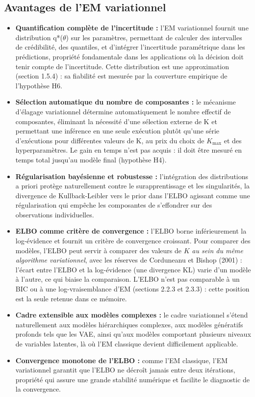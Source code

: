 \subsection{Avantages de l'EM variationnel}
\begin{itemize}
\item \textbf{Quantification complète de l'incertitude : }l'EM variationnel fournit une distribution q*($\theta $) sur les paramètres, permettant de calculer des intervalles de crédibilité, des quantiles, et d'intégrer l'incertitude paramétrique dans les prédictions, propriété fondamentale dans les applications où la décision doit tenir compte de l'incertitude. Cette distribution est une approximation (section 1.5.4) : sa fiabilité est mesurée par la couverture empirique de l'hypothèse H6.
\item \textbf{Sélection automatique du nombre de composantes : }le mécanisme d'élagage variationnel détermine automatiquement le nombre effectif de composantes, éliminant la nécessité d'une sélection externe de K et permettant une inférence en une seule exécution plutôt qu'une série d'exécutions pour différentes valeurs de K, au prix du choix de $K_{\max}$ et des hyperparamètres. Le gain en temps n'est pas acquis : il doit être mesuré en temps total jusqu'au modèle final (hypothèse H4).
\item \textbf{Régularisation bayésienne et robustesse : }l'intégration des distributions a priori protège naturellement contre le surapprentissage et les singularités, la divergence de Kullback-Leibler vers le prior dans l'ELBO agissant comme une régularisation qui empêche les composantes de s'effondrer sur des observations individuelles.
\item \textbf{ELBO comme critère de convergence : }l'ELBO borne inférieurement la log-évidence et fournit un critère de convergence croissant. Pour comparer des modèles, l'ELBO peut servir à comparer des valeurs de $K$ \emph{au sein du même algorithme variationnel}, avec les réserves de Corduneanu et Bishop (2001) : l'écart entre l'ELBO et la log-évidence (une divergence KL) varie d'un modèle à l'autre, ce qui biaise la comparaison. L'ELBO n'est pas comparable à un BIC ou à une log-vraisemblance d'EM (sections 2.2.3 et 2.3.3) : cette position est la seule retenue dans ce mémoire.
\item \textbf{Cadre extensible aux modèles complexes : }le cadre variationnel s'étend naturellement aux modèles hiérarchiques complexes, aux modèles génératifs profonds tels que les VAE, ainsi qu'aux modèles comportant plusieurs niveaux de variables latentes, là où l'EM classique devient difficilement applicable.
\item \textbf{Convergence monotone de l'ELBO : }comme l'EM classique, l'EM variationnel garantit que l'ELBO ne décroît jamais entre deux itérations, propriété qui assure une grande stabilité numérique et facilite le diagnostic de la convergence.
\end{itemize}
